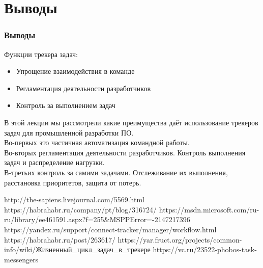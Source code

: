 \documentclass{../industrial-development}
\begin{document}
\section{Выводы}
\begin{frame} \frametitle{Выводы}
Функции трекера задач:
\begin{itemize}
	\item Упрощение взаимодействия в команде
	\item Регламентация деятельности разработчиков
	\item Контроль за выполнением задач
\end{itemize}

\end{frame}
\lecturenotes
В этой лекции мы рассмотрели какие преимущества даёт использование трекеров задач для промышленной разработки ПО.\\
Во-первых это частичная автоматизация командной работы.\\
Во-вторых регламентация деятельности разработчиков. Контроль выполнения задач и распределение нагрузки.\\
В-третьих контроль за самими задачами. Отслеживание их выполнения, расстановка приоритетов, защита от потерь.

\begin{thebibliography}{99}
http://the-sapiens.livejournal.com/5569.html
https://habrahabr.ru/company/pt/blog/316724/
https://msdn.microsoft.com/ru-ru/library/ee461591.aspx?f=255&MSPPError=-2147217396
https://yandex.ru/support/connect-tracker/manager/workflow.html
https://habrahabr.ru/post/263617/
https://yar.fruct.org/projects/common-info/wiki/Жизненный_цикл_задач_в_трекере
https://vc.ru/23522-phobos-task-messengers
\end{thebibliography}
\end{document}

